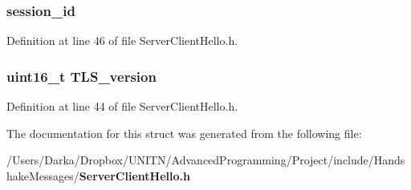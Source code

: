 \subsubsection[{session\+\_\+id}]{ {\bf session\+\_\+id}}\label{structhandshake__hello_a677c63f78d75b4f96f0623c3e52726ea}


Definition at line 46 of file Server\+Client\+Hello.\+h.

\subsubsection[{T\+L\+S\+\_\+version}]{\setlength{\rightskip}{0pt plus 5cm}uint16\+\_\+t {\bf T\+L\+S\+\_\+version}}\label{structhandshake__hello_a5b4305b976c657bb4a056e00aeadb8ef}


Definition at line 44 of file Server\+Client\+Hello.\+h.



The documentation for this struct was generated from the following file\+:\begin{DoxyCompactItemize}
\item 
/\+Users/\+Darka/\+Dropbox/\+U\+N\+I\+T\+N/\+Advanced\+Programming/\+Project/include/\+Handshake\+Messages/{\bf Server\+Client\+Hello.\+h}\end{DoxyCompactItemize}
